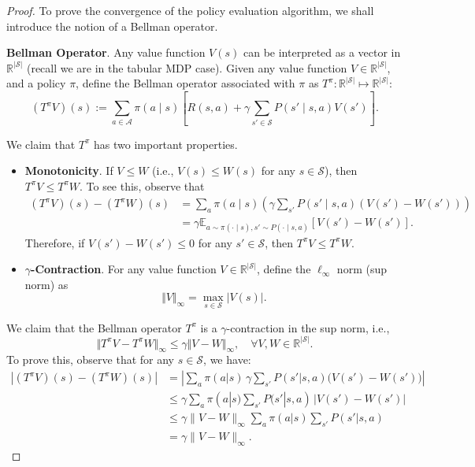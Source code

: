\documentclass[
]{book}
\theoremstyle{definition}
\theoremstyle{definition}
\theoremstyle{definition}
\theoremstyle{definition}
\theoremstyle{remark}
\begin{document}
\begin{proof}
To prove the convergence of the policy evaluation algorithm, we shall introduce the notion of a Bellman operator.

\textbf{Bellman Operator}. Any value function \(V(s)\) can be interpreted as a vector in \(\mathbb{R}^{|\mathcal{S}|}\) (recall we are in the tabular MDP case). Given any value function \(V \in \mathbb{R}^{|\mathcal{S}|}\), and a policy \(\pi\), define the Bellman operator associated with \(\pi\) as \(T^{\pi}: \mathbb{R}^{|\mathcal{S}|} \mapsto \mathbb{R}^{|\mathcal{S}|}\):
\begin{equation}
(T^{\pi} V)(s) := \sum_{a \in \mathcal{A}} \pi(a \mid s) 
\left[ R(s,a) + \gamma \sum_{s' \in \mathcal{S}} P(s' \mid s,a) V(s') \right].
\label{eq:BellmanOperatorPolicy}
\end{equation}

We claim that \(T^{\pi}\) has two important properties.

\begin{itemize}
\item
  \textbf{Monotonicity}. If \(V \leq W\) (i.e., \(V(s) \leq W(s)\) for any \(s \in \mathcal{S}\)), then \(T^{\pi} V \leq T^{\pi}W\). To see this, observe that
  \begin{align*}
  (T^{\pi}V)(s) - (T^\pi W)(s) &= \sum_{a} \pi(a \mid s) \left(\gamma \sum_{s'} P(s' \mid s, a) (V(s') - W(s')) \right) \\
  & = \gamma \mathbb{E}_{a \sim \pi(\cdot \mid s), s' \sim P(\cdot \mid s,a)}[V(s') - W(s')].
  \end{align*}
  Therefore, if \(V(s') - W(s') \leq 0\) for any \(s' \in \mathcal{S}\), then \(T^{\pi}V \leq T^{\pi} W\).
\item
  \textbf{\(\gamma\)-Contraction}. For any value function \(V \in \mathbb{R}^{|\mathcal{S}|}\), define the \(\ell_{\infty}\) norm (sup norm) as
  \[
  \Vert V \Vert_{\infty} = \max_{s \in \mathcal{S}} |V(s)|.
  \]
\end{itemize}

We claim that the Bellman operator \(T^{\pi}\) is a \(\gamma\)-contraction in the sup norm, i.e.,
\begin{equation}
\Vert T^\pi V - T^\pi W \Vert_{\infty} \leq \gamma \Vert V - W \Vert_{\infty}, \quad \forall V, W \in \mathbb{R}^{|\mathcal{S}|}.
\label{eq:gamma-contraction-Bellman-operator}
\end{equation}
To prove this, observe that for any \(s \in \mathcal{S}\), we have:
\begin{align*}
|(T^\pi V)(s) - (T^\pi W)(s)|
&= \left| \sum_a \pi(a|s)\,\gamma \sum_{s'} P(s'|s,a)\big(V(s') - W(s')\big) \right| \\
&\le \gamma \sum_a \pi(a|s)\sum_{s'} P(s'|s,a)\,|V(s') - W(s')| \\
&\le \gamma \|V - W\|_\infty \sum_a \pi(a|s)\sum_{s'} P(s'|s,a) \\
&= \gamma \|V - W\|_\infty.
\end{align*}


\end{proof}
\end{document}
